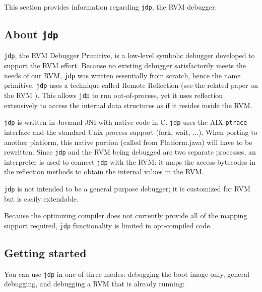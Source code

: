 This section provides information regarding {\tt jdp}, the RVM
debugger.

\subsection{About {\tt jdp}}

  {\tt jdp}, the RVM Debugger Primitive, is a low-level symbolic debugger 
developed to support the
RVM effort.  Because no existing debugger satisfactorily meets the
needs of our RVM, {\tt jdp} was written essentially from scratch, hence the
name primitive.  {\tt jdp} uses a technique called Remote
Reflection (see the related paper on the RVM 
).  This
allows {\tt jdp} to run out-of-process, yet it uses reflection extensively to
access the internal data structures as if it resides inside the RVM.

{\tt jdp} is written in Java\trademark and JNI with native code in C.  {\tt jdp}
uses the
AIX {\tt ptrace} interface and the standard Unix process support (fork,
wait, ...).  When porting to another platform, this native portion
(called from Platform.java) will have to be rewritten.  Since {\tt jdp} and
the RVM being debugged are two separate processes, an interpreter is
used to connect {\tt jdp} with the RVM:  it maps the access bytecodes in the
reflection methods to obtain the internal values in the RVM.
  
  {\tt jdp} is not intended to be a general purpose debugger; it is 
customized for RVM but is easily extendable.  

   Because the optimizing compiler does not currently provide all of
   the mapping support required, {\tt jdp} functionality is limited in
   opt-compiled code. 

\subsection{Getting started}

   You can use {\tt jdp} in one of three modes: debugging the boot image only, 
general debugging, and debugging a RVM that is already running:

